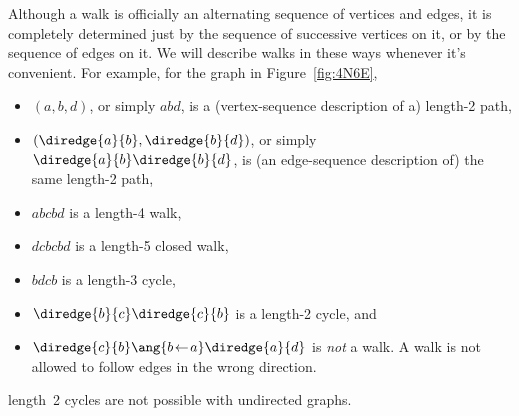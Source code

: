 Although a walk is officially an alternating sequence of vertices and
edges, it is completely determined just by the sequence of successive
vertices on it, or by the sequence of edges on it.  We will
describe walks in these ways whenever it's convenient.  For example,
for the graph in Figure~\ref{fig:4N6E},
\begin{itemize}

\item $(a, b, d)$, or simply $abd$, is a (vertex-sequence description
  of a) length-2 path,

\item $(\diredge{a}{b}, \diredge{b}{d})$, or simply
  $\diredge{a}{b}\diredge{b}{d}$, is (an edge-sequence description of)
  the same length-2 path,

\item $abcbd$ is a length-4 walk,

\item $dcbcbd$ is a length-5 closed walk,

\item $bdcb$ is a length-3 cycle,

\item $\diredge{b}{c}\diredge{c}{b}$ is a length-2 cycle, and

\item $\diredge{c}{b}\ang{b\! \leftarrow\! a}\diredge{a}{d}$
  is \emph{not} a walk.  A walk is not allowed to follow
  edges in the wrong direction.
\end{itemize}


\begin{editingnotes}
length~2 cycles are not possible with undirected graphs.
\end{editingnotes}

